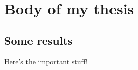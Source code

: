 \chapter{Body of my thesis}
\label{chapter:body}
\thispagestyle{myheadings}

\graphicspath{{2_Body/Figures/}}

\section{Some results}
\label{sec:results}

Here's the important stuff!